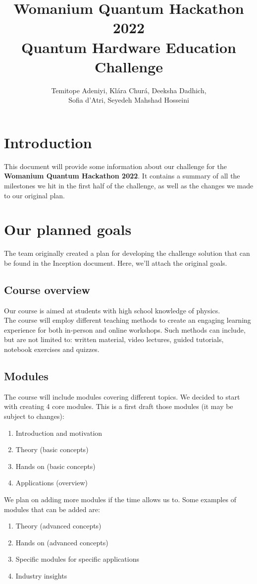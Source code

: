 \documentclass[hidelinks, a4paper,12pt]{article}
\title{Womanium Quantum Hackathon 2022\\Quantum Hardware Education Challenge}
\author{Temitope Adeniyi, Klára Churá, Deeksha Dadhich,\\Sofia d'Atri, Seyedeh Mahshad Hosseini}
\date{}
\begin{document}
\maketitle

\tableofcontents


\section{Introduction}
This document will provide some information about our challenge for the \textbf{Womanium Quantum Hackathon 2022}. It contains a summary of all the milestones we hit in the first half of the challenge, as well as the changes we made to our original plan.
\newpage
\section{Our planned goals}
The team originally created a plan for developing the challenge solution that can be found in the Inception document. Here, we'll attach the original goals.

\subsection{Course overview}
Our course is aimed at students with high school knowledge of physics.\\The course will employ different teaching methods to create an engaging learning experience for both in-person and online workshops. Such methods can include, but are not limited to: written material, video lectures, guided tutorials, notebook exercises and quizzes.
\subsection{Modules}
The course will include modules covering different topics. We decided to start with creating 4 core modules. This is a first draft those modules (it may be subject to changes):
\begin{enumerate}
  \item Introduction and motivation
  \item Theory (basic concepts)
  \item Hands on (basic concepts)
  \item Applications (overview)
\end{enumerate}
We plan on adding more modules if the time allows us to. Some examples of modules that can be added are:
\begin{enumerate}
  \item Theory (advanced concepts)
  \item Hands on (advanced concepts)
  \item Specific modules for specific applications
  \item Industry insights
\end{enumerate}
\end{document}
